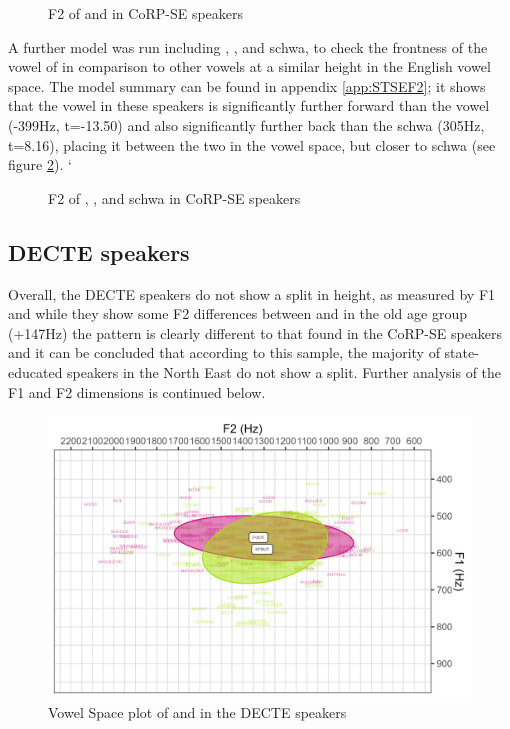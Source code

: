 \documentclass[../../../00.FullDoc/tex/ThesisSkeleton-draft2]{subfiles}
\begin{document}
\begin{figure}[h]
	
	\caption{F2 of \foot{} and \strutt{} in CoRP-SE speakers} \label{fig:FSF2SE}
\end{figure}

A further model was run including \strutt{}, , and schwa, to check  the frontness of the \strutt{} vowel of in comparison to other vowels at a similar height in the English vowel space. The model summary can be found in appendix \ref{app:STSEF2}; it shows that the \strutt{} vowel in these speakers is significantly further forward than the  vowel (-399Hz, t=-13.50) and also significantly further back than the schwa (305Hz, t=8.16), placing it between the two in the vowel space, but closer to schwa (see figure \ref{fig:STF2SE}).
`
\begin{figure}[h]
	
	\caption{F2 of \strutt{}, , and schwa in CoRP-SE speakers} \label{fig:STF2SE}
\end{figure}



\subsection{DECTE speakers}
Overall, the DECTE speakers do not show a split in height, as measured by F1 and while they show some F2 differences between \foot{} and \strutt{} in the old age group (+147Hz) the pattern is clearly different to that found in the CoRP-SE speakers and it can be concluded that according to this sample, the majority of state-educated speakers in the North East do not show a \FS{} split. Further analysis of the F1 and F2 dimensions is continued below.

\begin{figure}[h]
	\centering
	\includegraphics[width=\textwidth]{../figures/FS-DE-vplot.png}
	\caption{Vowel Space plot of \foot{} and \strutt{} in the DECTE speakers} \label{fig:FSvplotDE}
\end{figure}
\end{document}
